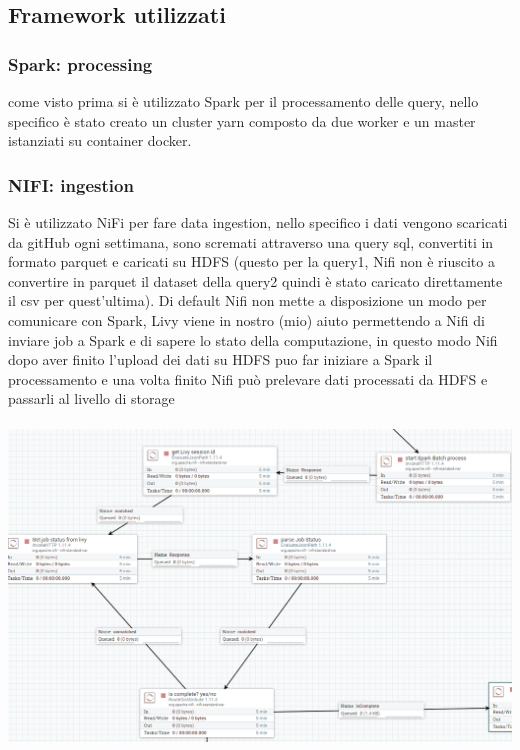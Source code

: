 \documentclass[acmsmall]{acmart}
\begin{document}
\subsection{Framework utilizzati}

\subsubsection{Spark: processing} 
come visto prima si è utilizzato Spark per il processamento delle query, nello specifico è stato creato un cluster yarn composto da due worker e un master istanziati su container docker.

\subsubsection{NIFI: ingestion}
Si è utilizzato NiFi per fare data ingestion, nello specifico i dati vengono scaricati da gitHub ogni settimana, sono scremati attraverso una query sql, convertiti in formato parquet e caricati su HDFS (questo per la query1, Nifi non è riuscito a convertire in parquet il dataset della query2 quindi è stato caricato direttamente il csv per quest'ultima).
Di default Nifi non mette a disposizione un modo per comunicare con Spark, Livy viene in nostro (mio) aiuto permettendo a Nifi di inviare job a Spark e di sapere lo stato della computazione, in questo modo Nifi dopo aver finito l'upload dei dati su HDFS puo far iniziare a Spark il processamento e una volta finito Nifi può prelevare dati processati da HDFS e passarli al livello di storage \\ \\
\includegraphics[width=14cm]{livy.png}
\\ \\
\end{document}

